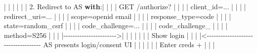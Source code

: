 \documentclass[11pt]{article}
\newenvironment{Shaded}{\begin{snugshade}}{\end{snugshade}}
\newcommand{\ControlFlowTok}[1]{\textcolor[rgb]{0.99,0.74,0.29}{\textbf{#1}}}
\newcommand{\FloatTok}[1]{\textcolor[rgb]{0.96,0.45,0.00}{#1}}
\newcommand{\NormalTok}[1]{\textcolor[rgb]{0.81,0.81,0.76}{#1}}
\newcommand{\OperatorTok}[1]{\textcolor[rgb]{0.81,0.81,0.76}{#1}}
\begin{document}
\begin{Shaded}
\begin{Highlighting}[]
  \OperatorTok{|}                \OperatorTok{|}                        \OperatorTok{|}                          \OperatorTok{|}
  \OperatorTok{|}                \OperatorTok{|} \FloatTok{2.}\NormalTok{ Redirect to AS }\ControlFlowTok{with}\NormalTok{:}\OperatorTok{|}                          \OperatorTok{|}
  \OperatorTok{|}                \OperatorTok{|}\NormalTok{    GET }\OperatorTok{/}\NormalTok{authorize?     }\OperatorTok{|}                          \OperatorTok{|}
  \OperatorTok{|}                \OperatorTok{|}\NormalTok{    client\_id}\OperatorTok{=}\NormalTok{...       }\OperatorTok{|}                          \OperatorTok{|}
  \OperatorTok{|}                \OperatorTok{|}\NormalTok{    redirect\_uri}\OperatorTok{=}\NormalTok{...    }\OperatorTok{|}                          \OperatorTok{|}
  \OperatorTok{|}                \OperatorTok{|}\NormalTok{    scope}\OperatorTok{=}\NormalTok{openid email  }\OperatorTok{|}                          \OperatorTok{|}
  \OperatorTok{|}                \OperatorTok{|}\NormalTok{    response\_type}\OperatorTok{=}\NormalTok{code  }\OperatorTok{|}                          \OperatorTok{|}
  \OperatorTok{|}                \OperatorTok{|}\NormalTok{    state}\OperatorTok{=}\NormalTok{random\_csrf   }\OperatorTok{|}                          \OperatorTok{|}
  \OperatorTok{|}                \OperatorTok{|}\NormalTok{    code\_challenge}\OperatorTok{=}\NormalTok{...  }\OperatorTok{|}                          \OperatorTok{|}
  \OperatorTok{|}                \OperatorTok{|}\NormalTok{    code\_challenge\_     }\OperatorTok{|}                          \OperatorTok{|}
  \OperatorTok{|}                \OperatorTok{|}\NormalTok{    method}\OperatorTok{=}\NormalTok{S256         }\OperatorTok{|}                          \OperatorTok{|}
  \OperatorTok{|}                \OperatorTok{|{-}{-}{-}{-}{-}{-}{-}{-}{-}{-}{-}{-}{-}{-}{-}{-}{-}{-}{-}{-}{-}{-}{-}\textgreater{}|}                          \OperatorTok{|}
  \OperatorTok{|}                \OperatorTok{|}                        \OperatorTok{|}                          \OperatorTok{|}
  \OperatorTok{|}\NormalTok{   Show login   }\OperatorTok{|}                        \OperatorTok{|}                          \OperatorTok{|}
  \OperatorTok{|\textless{}{-}{-}{-}{-}{-}{-}{-}{-}{-}{-}{-}{-}{-}{-}{-}{-}{-}{-}{-}{-}{-}{-}{-}{-}{-}{-}{-}{-}{-}{-}{-}{-}{-}{-}{-}{-}}\NormalTok{ AS presents login}\OperatorTok{/}\NormalTok{consent UI  }\OperatorTok{|}
  \OperatorTok{|}                \OperatorTok{|}                        \OperatorTok{|}                          \OperatorTok{|}
  \OperatorTok{|}\NormalTok{ Enter creds }\OperatorTok{+}  \OperatorTok{|}                        \OperatorTok{|}                          \OperatorTok{|}

\end{Highlighting}
\end{Shaded}
\end{document}
